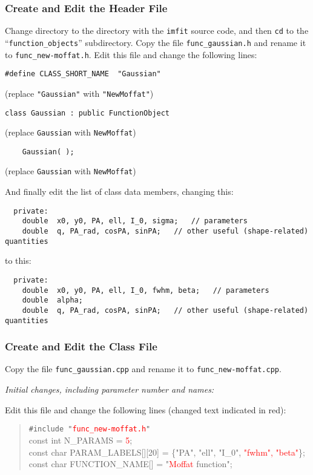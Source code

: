\documentclass[10pt]{article}
\newcommand{\imfit}{\texttt{imfit}}
\newcommand{\red}{\textcolor{red}}
\begin{document}
\subsubsection{Create and Edit the Header File}

Change directory to the directory with the \imfit{} source code, and then
\texttt{cd} to the ``\texttt{function\_objects}'' subdirectory. Copy the file
\texttt{func\_gaussian.h} and rename it to \texttt{func\_new-moffat.h}. Edit
this file and change the following lines:

\begin{verbatim}
#define CLASS_SHORT_NAME  "Gaussian"
\end{verbatim} 
(replace \texttt{"Gaussian"} with \texttt{"NewMoffat"})

\begin{verbatim}
class Gaussian : public FunctionObject
\end{verbatim}
(replace \texttt{Gaussian} with \texttt{NewMoffat})

\begin{verbatim}
    Gaussian( );
\end{verbatim}
(replace \texttt{Gaussian} with \texttt{NewMoffat})

And finally edit the list of class data members, changing this:
\begin{verbatim}
  private:
    double  x0, y0, PA, ell, I_0, sigma;   // parameters
    double  q, PA_rad, cosPA, sinPA;   // other useful (shape-related) quantities
\end{verbatim}
to this:
\begin{verbatim}
  private:
    double  x0, y0, PA, ell, I_0, fwhm, beta;   // parameters
    double  alpha;
    double  q, PA_rad, cosPA, sinPA;   // other useful (shape-related) quantities
\end{verbatim}


\subsubsection{Create and Edit the Class File}

Copy the file \texttt{func\_gaussian.cpp} and rename it to \texttt{func\_new-moffat.cpp}. 

\bigskip
\noindent \textit{Initial changes, including parameter number and names:}
\smallskip

Edit this file and change the following lines (changed text indicated in red):

\begin{quote}
\texttt{\#include "\red{func\_new-moffat.h}"} \\

const int  N\_PARAMS = \red{5}; \\

const char  PARAM\_LABELS[][20] = \{"PA", "ell", "I\_0", \red{"fwhm", "beta"}\}; \\

const char  FUNCTION\_NAME[] = "\red{Moffat} function";

\end{quote}
\end{document}
